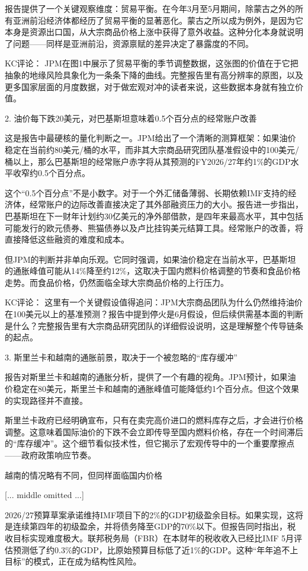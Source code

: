 \documentclass[11pt]{ctexart}
\begin{document}
报告提供了一个关键观察维度：贸易平衡。在今年3月至5月期间，除蒙古之外的所有亚洲前沿经济体都经历了贸易平衡的显著恶化。蒙古之所以成为例外，是因为它本身是资源出口国，从大宗商品价格上涨中获得了意外收益。这种分化本身就说明了问题——同样是亚洲前沿，资源禀赋的差异决定了暴露度的不同。

KC评论： JPM在图1中展示了贸易平衡的季节调整数据，这张图的价值在于它把抽象的地缘风险具象化为一条条下降的曲线。完整报告里有高分辨率的原图，以及更多国家层面的月度数据，对于做宏观对冲的读者来说，这些数据本身就有独立价值。

2. 油价每下跌20美元，对巴基斯坦意味着0.5个百分点的经常账户改善

这是报告中最硬核的量化判断之一。JPM给出了一个清晰的测算框架：如果油价稳定在当前约80美元/桶的水平，而非其大宗商品研究团队基准假设中的100美元/桶以上，那么巴基斯坦的经常账户赤字将从其预测的FY2026/27年约1\%的GDP水平收窄约0.5个百分点。

这个“0.5个百分点”不是小数字。对于一个外汇储备薄弱、长期依赖IMF支持的经济体，经常账户的边际改善直接决定了其外部融资压力的大小。报告进一步指出，巴基斯坦在下一财年计划约30亿美元的净外部借款，是四年来最高水平，其中包括可能发行的欧元债券、熊猫债券以及卢比挂钩美元结算工具。经常账户的改善，将直接降低这些融资的难度和成本。

但JPM的判断并非单向乐观。它同时强调，如果油价稳定在当前水平，巴基斯坦的通胀峰值可能从14\%降至约12\%，这取决于国内燃料价格调整的节奏和食品价格走势。而食品价格，仍然面临全球大宗商品价格的上行压力。

KC评论： 这里有一个关键假设值得追问：JPM大宗商品团队为什么仍然维持油价在100美元以上的基准预测？报告中提到停火是6月假设，但后续供需基本面的判断是什么？完整报告里有大宗商品研究团队的详细假设说明，这是理解整个传导链条的起点。

3. 斯里兰卡和越南的通胀前景，取决于一个被忽略的“库存缓冲”

报告对斯里兰卡和越南的通胀分析，提供了一个有趣的视角。JPM预计，如果油价稳定在80美元，斯里兰卡和越南的通胀峰值可能降低约1个百分点。但这个效果的实现路径并不直接。

斯里兰卡政府已经明确宣布，只有在卖完高价进口的燃料库存之后，才会进行价格调整。这意味着国际油价的下跌不会立即传导至国内燃料价格，存在一个时间滞后的“库存缓冲”。这个细节看似技术性，但它揭示了宏观传导中的一个重要摩擦点——政府政策响应节奏。

越南的情况略有不同，但同样面临国内价格

[... middle omitted ...]

2026/27预算草案承诺维持IMF项目下的2\%的GDP初级盈余目标。如果实现，这将是连续第四年的初级盈余，并将债务降至GDP的70\%以下。但报告同时指出，税收目标实现难度极大。联邦税务局（FBR）在本财年的税收收入已经比IMF 5月评估预测低了约0.3\%的GDP，比原始预算目标低了近1\%的GDP。这种“年年追不上目标”的模式，正在成为结构性风险。
\end{document}
